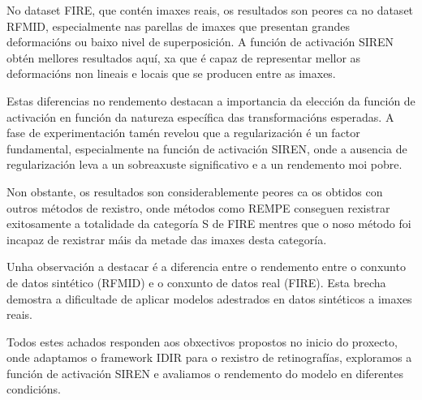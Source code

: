 No dataset FIRE, que contén imaxes reais, os resultados son peores ca no dataset RFMID, especialmente nas parellas de imaxes que presentan grandes deformacións ou baixo nivel de superposición.
A función de activación SIREN obtén mellores resultados aquí, xa que é capaz de representar mellor as deformacións non lineais e locais que se producen entre as imaxes.

Estas diferencias no rendemento destacan a importancia da elección da función de activación en función da natureza específica das transformacións esperadas.
A fase de experimentación tamén revelou que a regularización é un factor fundamental, especialmente na función de activación SIREN, onde a ausencia de regularización leva a un sobreaxuste significativo e a un rendemento moi pobre.

Non obstante, os resultados son considerablemente peores ca os obtidos con outros métodos de rexistro, onde métodos como REMPE \cite{rempe} conseguen rexistrar exitosamente a totalidade da categoría S de FIRE mentres que o noso método foi incapaz de rexistrar máis da metade das imaxes desta categoría.

Unha observación a destacar é a diferencia entre o rendemento entre o conxunto de datos sintético (RFMID) e o conxunto de datos real (FIRE). Esta brecha demostra a dificultade de aplicar modelos adestrados en datos sintéticos a imaxes reais.

Todos estes achados responden aos obxectivos propostos no inicio do proxecto, onde adaptamos o framework IDIR para o rexistro de retinografías, exploramos a función de activación SIREN e avaliamos o rendemento do modelo en diferentes condicións.
